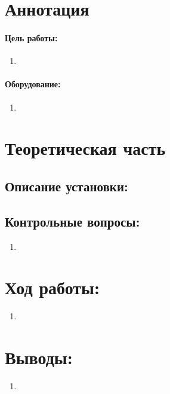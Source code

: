 \documentclass[a4paper,12pt]{article}
\author{Бичина Марина 
группа Б04-005 1 курса ФЭФМ}
\title{}
\date{}
\begin{document}

\maketitle
\newpage

\section{Аннотация}

\paragraph{Цель работы:} 
\begin{enumerate}
\itemsep0em
\item 
\end{enumerate}
\paragraph{Оборудование:}
\begin{enumerate}
\itemsep0em
\item 
\end{enumerate}
\section{Теоретическая часть}
\paragraph{}

\subsection{Описание установки:}
\paragraph{}

\subsection{Контрольные вопросы:}
\begin{enumerate}
\itemsep0em
\item 
\end{enumerate}
\section{Ход работы:}
\begin{enumerate}
\renewcommand{\labelenumii}{\arabic{enumii})}
\itemsep0em
\item
\end{enumerate}
\section{Выводы:}
\begin{enumerate}
\item
\end{enumerate}
\end{document}
